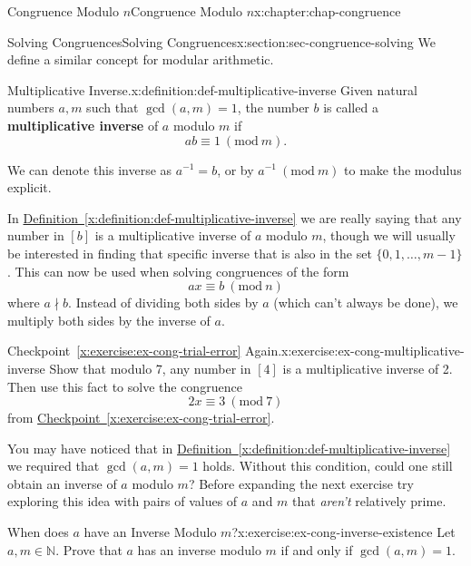 \documentclass[oneside,10pt,]{book}
\newcommand{\xreffont}{\relax}
\newcommand{\terminology}[1]{\textbf{#1}}
\numberwithin{equation}{section}
\newcommand{\Mod}[1]{\ \left(\mathrm{mod}\ #1\right)}
\begin{document}
\begin{chapterptx}{Congruence Modulo \(n\)}{}{Congruence Modulo \(n\)}{}{}{x:chapter:chap-congruence}
\begin{sectionptx}{Solving Congruences}{}{Solving Congruences}{}{}{x:section:sec-congruence-solving}
We define a similar concept for modular arithmetic.%
\begin{definition}{Multiplicative Inverse.}{x:definition:def-multiplicative-inverse}%
Given natural numbers \(a, m\) such that \(\gcd(a,m) = 1\), the number \(b\) is called a \terminology{multiplicative inverse} of \(a\) modulo \(m\) if%
\begin{equation*}
ab \equiv 1 \Mod{m}\text{.}
\end{equation*}
%
\par
We can denote this inverse as \(a^{-1} = b\), or by \(a^{-1} \Mod{m}\) to make the modulus explicit.%
\end{definition}
In \hyperref[x:definition:def-multiplicative-inverse]{Definition~{\xreffont\ref{x:definition:def-multiplicative-inverse}}} we are really saying that any number in \([b]\) is a multiplicative inverse of \(a\) modulo \(m\), though we will usually be interested in finding that specific inverse that is also in the set \(\{0,1,\ldots,m-1\}\). This can now be used when solving congruences of the form%
\begin{equation*}
ax \equiv b \Mod{n}
\end{equation*}
where \(a \nmid b\). Instead of dividing both sides by \(a\) (which can't always be done), we multiply both sides by the inverse of \(a\).%
\begin{inlineexercise}{Checkpoint~{\xreffont\ref*{x:exercise:ex-cong-trial-error}} Again.}{x:exercise:ex-cong-multiplicative-inverse}%
Show that modulo 7, any number in \([4]\) is a multiplicative inverse of 2. Then use this fact to solve the congruence%
\begin{equation*}
2x \equiv 3 \Mod{7}
\end{equation*}
from \hyperref[x:exercise:ex-cong-trial-error]{Checkpoint~{\xreffont\ref{x:exercise:ex-cong-trial-error}}}.%
\end{inlineexercise}%
You may have noticed that in \hyperref[x:definition:def-multiplicative-inverse]{Definition~{\xreffont\ref{x:definition:def-multiplicative-inverse}}} we required that \(\gcd(a,m) = 1\) holds. Without this condition, could one still obtain an inverse of \(a\) modulo \(m\)? Before expanding the next exercise try exploring this idea with pairs of values of \(a\) and \(m\) that \emph{aren't} relatively prime.%
\begin{inlineexercise}{When does \(a\) have an Inverse Modulo \(m\)?}{x:exercise:ex-cong-inverse-existence}%
Let \(a, m \in \mathbb{N}\). Prove that \(a\) has an inverse modulo \(m\) if and only if \(\gcd(a,m) = 1\).%

\end{inlineexercise}
\end{sectionptx}
\end{chapterptx}
\end{document}

